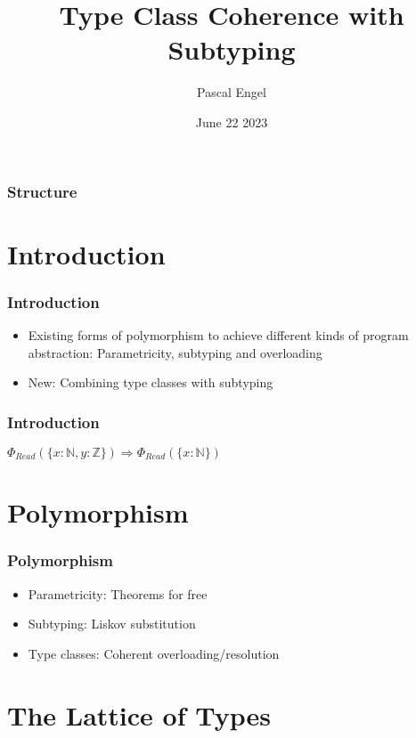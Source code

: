 \documentclass{beamer}
\title{Type Class Coherence with Subtyping}
\author{Pascal Engel}
\date{June 22 2023}
\newcommand\Nat{\mathbb{N}}
\newcommand\Int{\mathbb{Z}}
\begin{document}
\begin{frame}
    \maketitle
\end{frame}

\begin{frame}
    \frametitle{Structure}
    \tableofcontents
\end{frame}

\section{Introduction}

\begin{frame}
    \frametitle{Introduction}

    \begin{itemize}
        \item Existing forms of polymorphism to achieve different kinds of program abstraction: Parametricity, subtyping and overloading
        \item New: Combining type classes with subtyping
    \end{itemize}
\end{frame}

\begin{frame}
  \frametitle{Introduction}

  $\Phi_{\mathit{Read}}(\{ x : \Nat, y : \Int \}) \Rightarrow  \Phi_{\mathit{Read}}(\{ x : \Nat \})$
\end{frame}

\section{Polymorphism}

\begin{frame}
    \frametitle{Polymorphism}

    \begin{itemize}
      \item Parametricity: Theorems for free
      \item Subtyping: Liskov substitution
      \item Type classes: Coherent overloading/resolution
    \end{itemize}
\end{frame}

\section{The Lattice of Types}
\end{document}
